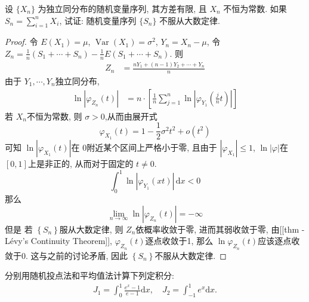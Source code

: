 \documentclass[../main.tex]{subfiles}
\begin{document}
\begin{exercise}{}{}
设 $\{X_n\}$ 为独立同分布的随机变量序列, 其方差有限, 且 $X_n$ 不恒为常数. 如果 $S_n = \sum_{i=1}^n X_i$, 试证: 随机变量序列 $\{S_n\}$ 不服从大数定律.
\end{exercise}
\begin{proof}
令 $E\left(X_1\right)= \mu$, $\operatorname{Var}\left(X_1\right)= \sigma ^{2}$, $Y_{n}= X_{n}-\mu$, 令 $Z_{n}=\frac{1 }{n }\left(S_1+ \cdots + S_{n}\right)-\frac{1 }{n }E\left(S_1+ \cdots + S_{n}\right)$. 则
 $$ \begin{aligned} Z_{n}&= \frac{nY_1+ \left(n-1\right)Y_2+ \cdots + Y_{n} }{n }\end{aligned} $$
由于 $Y_1,\cdots ,Y_{n}$独立同分布, 
 $$ \begin{aligned} \ln\left| \varphi_{Z_{n}}\left(t\right) \right|& =n\cdot \left[ \frac{1 }{n }\sum_{j =1}^{n}\ln\left| \varphi_{Y_1}\left(\frac{j }{n }t\right) \right|  \right]  \end{aligned} $$ 
若 $X_{n}$不恒为常数, 则 $\sigma> 0$,从而由展开式
 $$ \varphi_{X_1}\left(t\right) =1-\frac{1}{2}\sigma^{2}t^{2}+ o\left(t^{2}\right) $$ 
可知 $\ln\left| \varphi_{X_1}\left(t\right) \right|$在 $0$附近某个区间上严格小于零, 且由于 $\left|\varphi_{X_1} \right|\le 1$, $\ln\left| \varphi \right|$在$\left[ 0,1 \right]$上是非正的, 从而对于固定的 $t\neq 0$.
 $$ \int_{0}^{1}\ln\left| \varphi_{Y_1}\left(xt\right) \right|\,\mathrm{d} x< 0  $$
那么
 $$ \lim_{n\to \infty}\ln\left| \varphi_{Z_{n}}\left(t\right) \right| =-\infty  $$  
但是 若 $\left\{ S_{n} \right\}$服从大数定律, 则 $Z_{n}$依概率收敛于零, 进而其弱收敛于零, 由[[thm - Lévy's Continuity Theorem]], $\varphi_{Z_{n}}\left(t\right)$逐点收敛于1, 那么 $\ln\varphi_{Z_{n}}\left(t\right)$应该逐点收敛于0. 这与之前的讨论矛盾, 因此 $\left\{ S_{n} \right\}$不服从大数定律.
\end{proof}
\begin{exercise}{}{}
分别用随机投点法和平均值法计算下列定积分:
$$
\begin{aligned}
J_1 = \int_0^1 \frac{e^x - 1}{e - 1} \mathrm{d}x, \quad J_2 = \int_{-1}^1 e^x \mathrm{d}x.
\end{aligned}
$$
\end{exercise}
\end{document}
